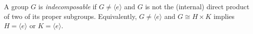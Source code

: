 A group $G$ is \emph{indecomposable} if $G \neq \langle e \rangle$ and $G$ is not the (internal) direct product of two of its proper subgroups. Equivalently, $G \neq \langle e \rangle$ and $G \cong H \times K$ implies $H = \langle e \rangle$ or $K = \langle e \rangle$.
